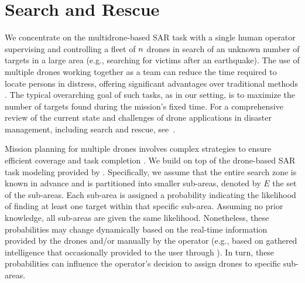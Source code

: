 \section{Search and Rescue}
\label{sec:sar_mission}


We concentrate on the multidrone-based SAR task with a single human operator supervising and controlling a fleet of $n$ drones in search of an unknown number of targets in a large area (e.g., searching for victims after an earthquake). The use of multiple drones working together as a team can reduce the time required to locate persons in distress, offering significant advantages over traditional methods \cite{hoang2023droneswarms}.  The typical overarching goal of such tasks, as in our setting, is to maximize the number of targets found during the mission's fixed time.
For a comprehensive review of the current state and challenges of drone applications in disaster management, including search and rescue, see~\cite{daud2022applications}.


Mission planning for multiple drones involves complex strategies to ensure efficient coverage and task completion \cite{song2023survey}.
We build on top of the drone-based SAR task modeling provided by \cite{du2019evolutionary}. Specifically, we assume that the entire search zone is known in advance and is partitioned into smaller sub-areas, denoted by $E$ the set of the sub-areas. Each sub-area is assigned a probability indicating the likelihood of finding at least one target within that specific sub-area. Assuming no prior knowledge, all sub-areas are given the same likelihood. Nonetheless, these probabilities may change dynamically based on the real-time information provided by the drones and/or manually by the operator (e.g.,  based on gathered intelligence that occasionally provided to the user through ). In turn, these probabilities can influence the operator's decision to assign drones to specific sub-areas.

